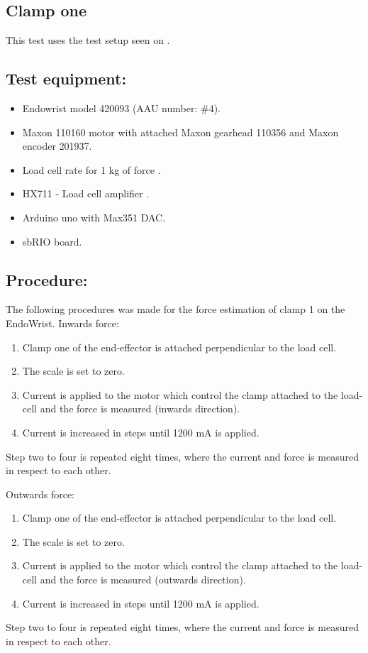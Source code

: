 \subsection{Clamp one} %
This test uses the test setup seen on .

\subsection*{Test equipment:}
\begin{itemize}
\item Endowrist model 420093 (AAU number: \#4).
\item Maxon 110160 motor with attached Maxon gearhead 110356 and Maxon encoder 201937.
\item Load cell rate for 1 kg of force \cite{Load_cell_1kg}.
\item HX711 - Load cell amplifier \cite{HX711}.
\item Arduino uno with Max351 DAC.
\item sbRIO board.
\end{itemize}

\subsection*{Procedure:}
The following procedures was made for the force estimation of clamp 1 on the EndoWrist. 
Inwards force:
\begin{enumerate}
\item Clamp one of the end-effector is attached perpendicular to the load cell. 
\item The scale is set to zero.
\item Current is applied to the motor which control the clamp attached to the load-cell and the force is measured (inwards direction).
\item Current is increased in steps until 1200 mA is applied.
\end{enumerate}
Step two to four is repeated eight times, where the current and force is measured in respect to each other. 

Outwards force:
\begin{enumerate}
\item Clamp one of the end-effector is attached perpendicular to the load cell. 
\item The scale is set to zero.
\item Current is applied to the motor which control the clamp attached to the load-cell and the force is measured (outwards direction).
\item Current is increased in steps until 1200 mA is applied.
\end{enumerate}
Step two to four is repeated eight times, where the current and force is measured in respect to each other. 

